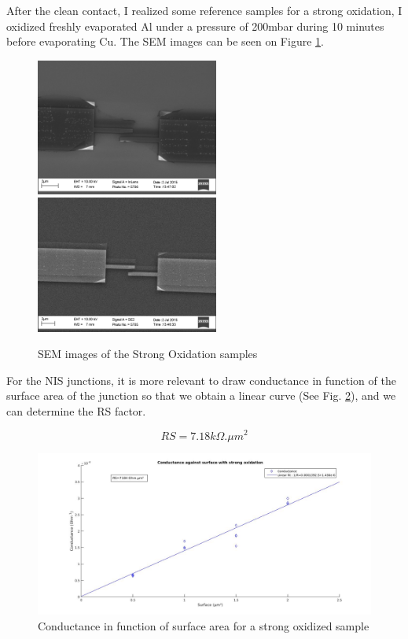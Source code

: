                 After the clean contact, I realized some reference samples for a strong oxidation, I oxidized freshly evaporated Al under a pressure of 200mbar during 10 minutes before evaporating Cu. The SEM images can be seen on Figure \ref{SEMstrongox}.
                
                \begin{figure}
                    \centering
                    \includegraphics[width=6cm]{SEMtest15_1.png}
                    \includegraphics[width=6cm]{SEMtest15_2.png}
                    \caption{SEM images of the Strong Oxidation samples}
                    \label{SEMstrongox}
                \end{figure}
                
                For the NIS junctions, it is more relevant to draw conductance in function of the surface area of the junction so that we obtain a linear curve (See Fig. \ref{Strongox}), and we can determine the RS factor.
                
                \[RS=7.18k\Omega.\mu m^2\]
                
                \begin{figure}
                    \centering
                    \includegraphics[width=12cm]{StrongOxLinear.jpg}
                    \caption{Conductance in function of surface area for a strong oxidized sample}
                    \label{Strongox}
                \end{figure}
                

